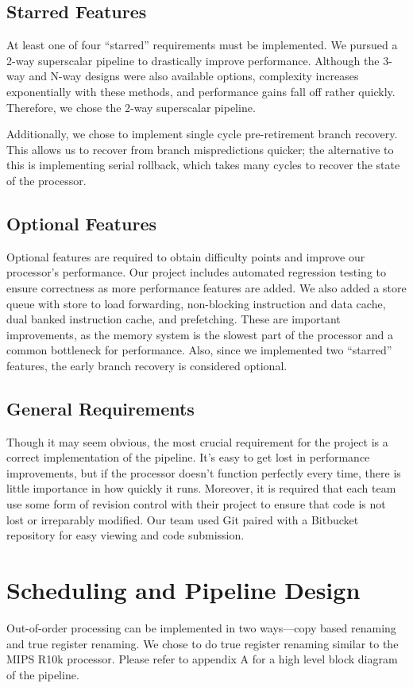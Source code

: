 \documentclass[10pt,journal,compsoc]{IEEEtran}
\begin{document}

\subsection{Starred Features}
At least one of four “starred” requirements must be implemented. We pursued a 2-way superscalar pipeline to drastically improve performance. Although the 3-way and N-way designs were also available options, complexity increases exponentially with these methods, and performance gains fall off rather quickly. Therefore, we chose the 2-way superscalar pipeline.

Additionally, we chose to implement single cycle pre-retirement branch recovery. This allows us to recover from branch mispredictions quicker; the alternative to this is implementing serial rollback, which takes many cycles to recover the state of the processor. 

\subsection{Optional Features}
Optional features are required to obtain difficulty points and improve our processor’s performance. Our project includes automated regression testing to ensure correctness as more performance features are added. We also added a store queue with store to load forwarding, non-blocking instruction and data cache, dual banked instruction cache, and prefetching. These are important improvements, as the memory system is the slowest part of the processor and a common bottleneck for performance. Also, since we implemented two “starred” features, the early branch recovery is considered optional.

\subsection{General Requirements}
Though it may seem obvious, the most crucial requirement for the project is a correct implementation of the pipeline. It’s easy to get lost in performance improvements, but if the processor doesn’t function perfectly every time, there is little importance in how quickly it runs. Moreover, it is required that each team use some form of revision control with their project to ensure that code is not lost or irreparably modified. Our team used Git paired with a Bitbucket repository for easy viewing and code submission.

\section{Scheduling and Pipeline Design}
Out-of-order processing can be implemented in two ways---copy based renaming and true register renaming. We chose to do true register renaming similar to the MIPS R10k processor. Please refer to appendix A for a high level block diagram of the pipeline.
\end{document}
